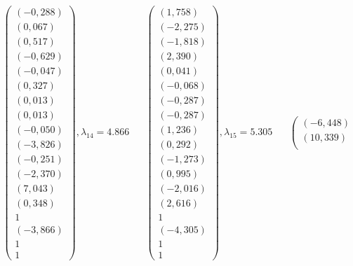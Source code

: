 \documentclass[a5paper, 10pt]{article}
\theoremstyle{definition}
\theoremstyle{plain}
\theoremstyle{remark}
\begin{document}
\begin{equation*}
\left(\begin{matrix}
\left(-0,288\right) \\
\left(0,067\right) \\
\left(0,517\right) \\
\left(-0,629\right) \\
\left(-0,047\right) \\
\left(0,327\right) \\
\left(0,013\right) \\
\left(0,013\right) \\
\left(-0,050\right) \\
\left(-3,826\right) \\
\left(-0,251\right) \\
\left(-2,370\right) \\
\left(7,043\right) \\
\left(0,348\right) \\
1 \\
\left(-3,866\right) \\
1 \\
1
\end{matrix}\right)
,  \lambda_ {14} =4.866\,\,\,\,\,\,\,\,\,\,
\left(\begin{matrix}
\left(1,758\right) \\
\left(-2,275\right) \\
\left(-1,818\right) \\
\left(2,390\right) \\
\left(0,041\right) \\
\left(-0,068\right) \\
\left(-0,287\right) \\
\left(-0,287\right) \\
\left(1,236\right) \\
\left(0,292\right) \\
\left(-1,273\right) \\
\left(0,995\right) \\
\left(-2,016\right) \\
\left(2,616\right) \\
1 \\
\left(-4,305\right) \\
1 \\
1
\end{matrix}\right)
,  \lambda_ {15} = 5.305\,\,\,\,\,\,\,\,\,\,
\left(\begin{matrix}
\left(-6,448\right) \\
\left(10,339\right) \\

\end{matrix}
\end{equation*}
\end{document}
